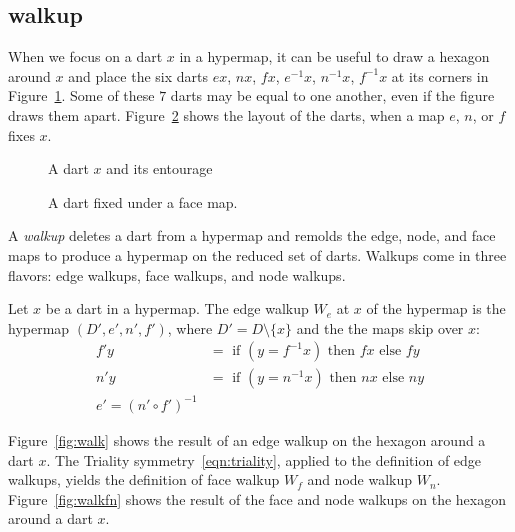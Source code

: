 \subsection{walkup}

When we focus on a dart $x$ in a
hypermap, it can be useful to draw a hexagon around $x$ and place
the six darts $e x$,
$n x$, $f x$, $e^{-1} x$, $n^{-1} x$, $f^{-1} x$ at its corners
in Figure~\ref{fig:dart+}.  Some of these $7$ darts may be
equal to one another, even if the figure draws them apart.
Figure~\ref{fig:dart-fix} shows the layout of the darts, when 
a map $e$, $n$, or $f$ fixes $x$.

\begin{figure}[htb]
  \centering
  \caption{A dart $x$ and its entourage}
  \label{fig:dart+}
\end{figure}

\begin{figure}[htb]
  \centering
  \caption{A dart fixed under a face map.}
  \label{fig:dart-fix}
\end{figure}


A {\it walkup} deletes
a dart from a hypermap and remolds the edge, node, and face
maps to produce a hypermap on the reduced set of darts.  Walkups
come in three flavors: edge walkups, face walkups,
and node walkups.

\begin{definition}[walkup]
Let $x$ be a dart in a hypermap.  The edge walkup 
$W_e$ at $x$ of the hypermap is the hypermap
$(D',e',n',f')$, where $D' = D\setminus\{x\}$ and the
the maps skip over $x$:
    $$
    \begin{array}{lll}
    f' y &= \text{ if } (y = f^{-1} x) \text{ then } f x \text{ else
    } f y\\
    n' y &= \text{ if } (y = n^{-1} x) \text{ then } n x \text{ else
    } n y\\
    e' = (n'\circ f')^{-1}
    \end{array}
    $$
\end{definition}

Figure~\ref{fig:walk} shows
the result of an edge walkup on the hexagon around a dart $x$.
The Triality symmetry~\ref{eqn:triality}, applied to the definition
of edge walkups, yields the definition of
face walkup $W_f$ and node walkup $W_n$.  
Figure~\ref{fig:walkfn} shows the result of the face and node
walkups on the hexagon around a dart $x$.

